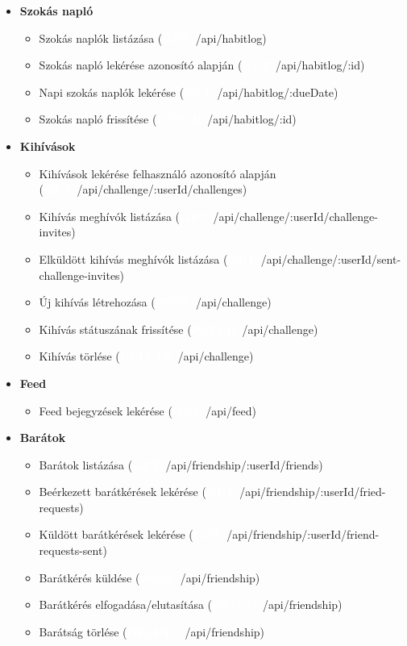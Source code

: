 \documentclass[12pt]{report}
\newcommand{\httpGet}[1]{\colorbox{getColor}{\textbf{\textcolor{white}{GET}}}~#1}
\newcommand{\httpPost}[1]{\colorbox{postColor}{\textbf{\textcolor{white}{POST}}}~#1}
\newcommand{\httpPatch}[1]{\colorbox{patchColor}{\textbf{\textcolor{white}{PATCH}}}~#1}
\newcommand{\httpDelete}[1]{\colorbox{deleteColor}{\textbf{\textcolor{white}{DELETE}}}~#1}
\begin{document}
\begin{itemize}
\begin{itemize}
      \item Szokás lekérése azonosító alapján (\httpGet{/api/habit/:id})
      \item Új szokás létrehozása (\httpPost{/api/habit})
      \item Szokás módosítása (\httpPatch{/api/habit/:id})
      \item Szokás törlése (\httpDelete{/api/habit/:id})
    \end{itemize}
  \item \textbf{Szokás napló}
    \begin{itemize}
      \item Szokás naplók listázása (\httpGet{/api/habitlog})
      \item Szokás napló lekérése azonosító alapján (\httpGet{/api/habitlog/:id})
      \item Napi szokás naplók lekérése (\httpGet{/api/habitlog/:dueDate})
      \item Szokás napló frissítése (\httpPatch{/api/habitlog/:id})
    \end{itemize}
  \item \textbf{Kihívások}
    \begin{itemize}
      \item Kihívások lekérése felhasználó azonosító alapján (\httpGet{/api/challenge/:userId/challenges})
      \item Kihívás meghívók listázása (\httpGet{/api/challenge/:userId/challenge-invites})
      \item Elküldött kihívás meghívók listázása (\httpGet{/api/challenge/:userId/sent-challenge-invites})
      \item Új kihívás létrehozása (\httpPost{/api/challenge})
      \item Kihívás státuszának frissítése (\httpPatch{/api/challenge})
      \item Kihívás törlése (\httpDelete{/api/challenge})
    \end{itemize}
  \item \textbf{Feed}
    \begin{itemize}
      \item Feed bejegyzések lekérése (\httpGet{/api/feed})        
    \end{itemize}
  \item \textbf{Barátok}
    \begin{itemize}
      \item Barátok listázása (\httpGet{/api/friendship/:userId/friends})
      \item Beérkezett barátkérések lekérése (\httpGet{/api/friendship/:userId/fried-requests})
      \item Küldött barátkérések lekérése (\httpGet{/api/friendship/:userId/friend-requests-sent})
      \item Barátkérés küldése (\httpPost{/api/friendship})
      \item Barátkérés elfogadása/elutasítása (\httpPatch{/api/friendship})
      \item Barátság törlése (\httpDelete{/api/friendship})
    \end{itemize}
\end{itemize}
\end{document}
